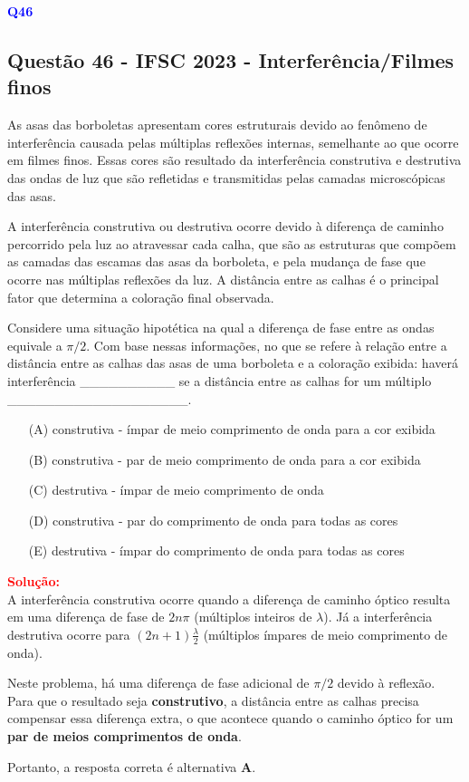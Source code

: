 \begin{flushleft}
\textbf{\textcolor{blue}{\Large Q46}}\\
\noindent

\subsection{Quest\~ao 46 - IFSC 2023 - Interferência/Filmes finos}

As asas das borboletas apresentam cores estruturais devido ao fenômeno de interferência causada pelas 
múltiplas reflexões internas, semelhante ao que ocorre em filmes finos. Essas cores são resultado da 
interferência construtiva e destrutiva das ondas de luz que são refletidas e transmitidas pelas camadas 
microscópicas das asas. 

A interferência construtiva ou destrutiva ocorre devido à diferença de caminho percorrido pela luz ao 
atravessar cada calha, que são as estruturas que compõem as camadas das escamas das asas da borboleta, 
e pela mudança de fase que ocorre nas múltiplas reflexões da luz. A distância entre as calhas é o principal 
fator que determina a coloração final observada.

Considere uma situação hipotética na qual a diferença de fase entre as ondas equivale a $\pi/2$. Com base 
nessas informações, no que se refere à relação entre a distância entre as calhas das asas de uma borboleta 
e a coloração exibida: haverá interferência \_\_\_\_\_\_\_\_\_\_ se a distância entre as calhas for um 
múltiplo \_\_\_\_\_\_\_\_\_\_\_\_\_\_\_\_\_\_\_.

\begin{itemize}
\item[(A)] construtiva - ímpar de meio comprimento de onda para a cor exibida
\item[(B)] construtiva - par de meio comprimento de onda para a cor exibida
\item[(C)] destrutiva - ímpar de meio comprimento de onda
\item[(D)] construtiva - par do comprimento de onda para todas as cores
\item[(E)] destrutiva - ímpar do comprimento de onda para todas as cores
\end{itemize}

\vspace{0.5cm}

\textcolor{red}{\textbf{Solução:}}\\

A interferência construtiva ocorre quando a diferença de caminho óptico resulta em uma diferença de fase de 
$2n\pi$ (múltiplos inteiros de $\lambda$). Já a interferência destrutiva ocorre para $(2n+1)\frac{\lambda}{2}$ 
(múltiplos ímpares de meio comprimento de onda).  

Neste problema, há uma diferença de fase adicional de $\pi/2$ devido à reflexão. Para que o resultado seja 
\textbf{construtivo}, a distância entre as calhas precisa compensar essa diferença extra, o que acontece quando 
o caminho óptico for um \textbf{par de meios comprimentos de onda}.  

Portanto, a resposta correta é alternativa \colorbox{green!50}{\textbf{A}}.
\end{flushleft}

